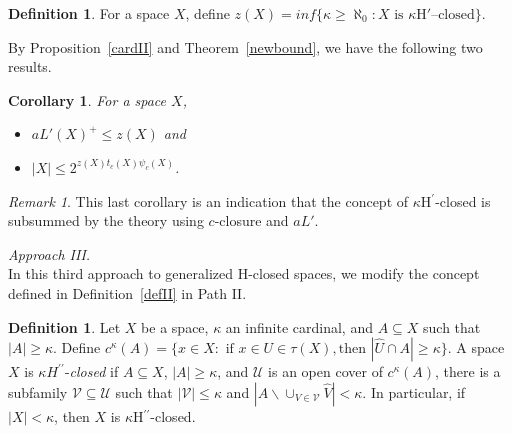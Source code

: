 \documentclass[11pt]{amsart}
\newif\ifdraft\draftfalse
\newtheorem{corollary}[theorem]{Corollary}
\theoremstyle{definition}
\newtheorem{definition}[theorem]{Definition}
\theoremstyle{remark}
\newtheorem*{remark}{Remark}
\numberwithin{equation}{section}
\begin{document}
\begin{definition}  
For a space $X$, define $z(X) = inf\{\kappa \geq \aleph_0: X \text{ is } \kappa\text{H}'\text{--closed}\}$.
\end{definition}

By Proposition~\ref{cardII} and Theorem~\ref{newbound}, we have the following two results.

\begin{corollary}{{\immediate{}}{\ifdraft\hspace{-\lastskip}\vadjust{\vspace{-1mm}\smash{\llap{{\tt {{corII}}}\hspace{8mm}}}\vspace{1mm}}\fi}} For a space $X$, 
\begin{itemize}
\item[(a)] $aL'(X)^+ \leq z(X)$ and 
\item[(b)] $|X| \leq 2^{z(X)t_c(X)\psi_c(X)}$.
\end{itemize}
\end{corollary}

\begin{remark}
This last corollary is an indication that the concept of $\kappa$H$^{\prime}$-closed is subsummed by the theory using $c$-closure and $aL'$.
\end{remark}

\noindent\emph{Approach III.}\\

In this third approach to generalized H-closed spaces, we modify the concept  defined in Definition~\ref{defII} in Path II.

\begin{definition}{{\immediate{}}{\ifdraft\hspace{-\lastskip}\vadjust{\vspace{-1mm}\smash{\llap{{\tt {{kH''closed}}}\hspace{8mm}}}\vspace{1mm}}\fi}}
Let $X$ be a space, $\kappa$ an infinite cardinal, and  $A \subseteq X$ such that $|A| \geq \kappa$. Define $c^{\kappa}(A) = \{x \in X: \text{ if } x \in U \in \tau(X), \text{then } |\hat{U} \cap A| \geq \kappa \}$.  A space $X$ is $\kappa H^{\prime\prime}$-\emph{closed} if $A \subseteq X$, $|A| \geq \kappa$, and $\mathcal U$ is an open cover of $c^{\kappa}(A)$, there is a subfamily $\mathcal V \subseteq \mathcal U$ such that $|\mathcal V| \leq \kappa$ and $|A \backslash \cup_{V \in \mathcal V}\hat{V}| < \kappa$.  In particular, if $|X| < \kappa$, then $X$ is ${\kappa}$H$^{\prime\prime}$-closed.

\end{definition}
  
\end{document}
